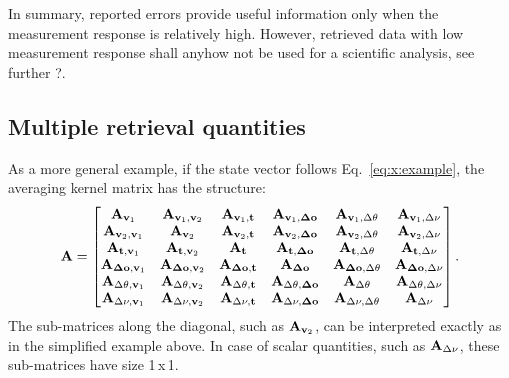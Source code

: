 In summary, reported errors provide useful information only when the
measurement response is relatively high. However, retrieved data with low
measurement response shall anyhow not be used for a scientific analysis, see
further ?.


\subsection*{Multiple retrieval quantities}
%
As a more general example, if the state vector follows Eq.~\ref{eq:x:example},
the averaging kernel matrix has the structure:
\begin{equation}
  \label{eq:A:example}
  \mathbf{A} =
  \begin{bmatrix}
    \mathbf{A}_{\mathbf{v}_1} & \mathbf{A}_{\mathbf{v}_1,\mathbf{v}_2} &
    \mathbf{A}_{\mathbf{v}_1,\mathbf{t}} & \mathbf{A}_{\mathbf{v}_1,\mathbf{\Delta\mathbf{o}}} &
    \mathbf{A}_{\mathbf{v}_1,\Delta\theta} & \mathbf{A}_{\mathbf{v}_1,\Delta\nu} \\ 
    \mathbf{A}_{\mathbf{v}_2,\mathbf{v}_1} & \mathbf{A}_{\mathbf{v}_2} &
    \mathbf{A}_{\mathbf{v}_2,\mathbf{t}} & \mathbf{A}_{\mathbf{v}_2,\mathbf{\Delta\mathbf{o}}} &
    \mathbf{A}_{\mathbf{v}_2,\Delta\theta} & \mathbf{A}_{\mathbf{v}_2,\Delta\nu} \\ 
    \mathbf{A}_{\mathbf{t},\mathbf{v}_1} & \mathbf{A}_{\mathbf{t},\mathbf{v}_2} &
    \mathbf{A}_{\mathbf{t}} & \mathbf{A}_{\mathbf{t},\mathbf{\Delta\mathbf{o}}} &
    \mathbf{A}_{\mathbf{t},\Delta\theta} & \mathbf{A}_{\mathbf{t},\Delta\nu} \\ 
    \mathbf{A}_{\mathbf{\Delta\mathbf{o}},\mathbf{v}_1} & 
    \mathbf{A}_{\mathbf{\Delta\mathbf{o}},\mathbf{v}_2} &
    \mathbf{A}_{\mathbf{\Delta\mathbf{o}},\mathbf{t}} & \mathbf{A}_{\mathbf{\Delta\mathbf{o}}} &
    \mathbf{A}_{\mathbf{\Delta\mathbf{o}},\Delta\theta} &
    \mathbf{A}_{\mathbf{\Delta\mathbf{o}},\Delta\nu} \\ 
    \mathbf{A}_{\Delta\theta,\mathbf{v}_1} & \mathbf{A}_{\Delta\theta,\mathbf{v}_2} &
    \mathbf{A}_{\Delta\theta,\mathbf{t}} & \mathbf{A}_{\Delta\theta,\mathbf{\Delta\mathbf{o}}} &
    \mathbf{A}_{\Delta\theta} & \mathbf{A}_{\Delta\theta,\Delta\nu} \\ 
    \mathbf{A}_{\Delta\nu,\mathbf{v}_1} & \mathbf{A}_{\Delta\nu,\mathbf{v}_2} &
    \mathbf{A}_{\Delta\nu,\mathbf{t}} & \mathbf{A}_{\Delta\nu,\mathbf{\Delta\mathbf{o}}} &
    \mathbf{A}_{\Delta\nu,\Delta\theta} & \mathbf{A}_{\Delta\nu}
  \end{bmatrix}.
\end{equation}
The sub-matrices along the diagonal, such as $\mathbf{A}_{\mathbf{v}_2}$, can
be interpreted exactly as in the simplified example above. In case of scalar
quantities, such as $\mathbf{A}_{\Delta\nu}$, these sub-matrices have size 1\,x\,1.

